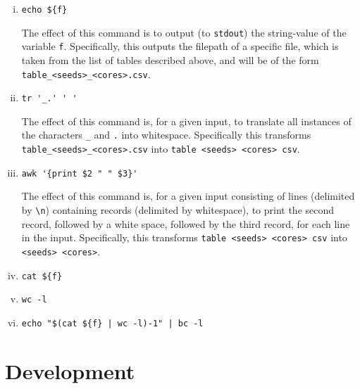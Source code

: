 \documentclass{article}
\begin{document}
\begin{enumerate}[i.]
\item
  \lstinline!echo ${f}!

  The effect of this command is to output (to \lstinline{stdout}) the
  string-value of the variable \lstinline{f}.
  Specifically, this outputs the filepath of a specific file, which is taken
  from the list of tables described above, and will be of the form
  \lstinline!table_<seeds>_<cores>.csv!.

\item
  \lstinline!tr '_.' ' '!

  The effect of this command is, for a given input, to translate all instances
  of the characters \lstinline!_! and \lstinline!.! into whitespace.
  Specifically this transforms \lstinline!table_<seeds>_<cores>.csv! into
  \lstinline!table <seeds> <cores> csv!.

\item
  \lstinline!awk '{print $2 " " $3}'!

  The effect of this command is, for a given input consisting of lines
  (delimited by \lstinline!\n!) containing records (delimited by whitespace), to
  print the second record, followed by a white space, followed by the third
  record, for each line in the input.
  Specifically, this transforms \lstinline!table <seeds> <cores> csv! into
  \lstinline!<seeds> <cores>!.


\item
  \lstinline!cat ${f}!

\item
  \lstinline!wc -l!

\item
  \lstinline!echo "$(cat ${f} | wc -l)-1" | bc -l!


\end{enumerate}

\clearpage

\section{Development}
\label{sec:development}


\end{document}

